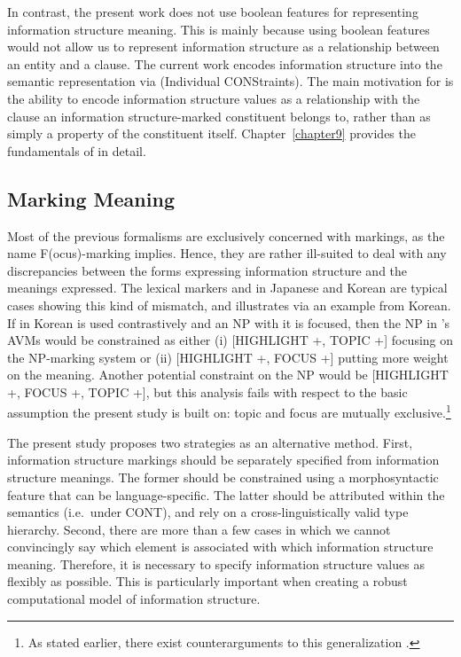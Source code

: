 In contrast, the present work does not use boolean features for
representing information structure meaning. This is mainly because
using boolean features would not allow us to represent information
structure as a relationship between an entity and a clause. The
current work encodes information structure into the semantic
representation via  (Individual CONStraints).
The main motivation for  is the ability to
encode information structure values as a relationship with the clause
an information structure-marked constituent belongs to, rather than as
simply a property of the constituent itself.  Chapter~\ref{chapter9}
provides the fundamentals of  in detail.




\subsection{Marking \vs Meaning}
\label{8:ssec:hpsg:makring-meaning}

Most of the previous formalisms are exclusively concerned with
markings, as the name F(ocus)-marking implies.  Hence, they are rather
ill-suited to deal with any discrepancies between the forms expressing
information structure and the meanings expressed.
The lexical markers \wa and \nun in Japanese and Korean are typical
cases showing this kind of mismatch, and 
illustrates via an example from Korean.  If \nun in Korean is used
contrastively and an NP with it is focused, then the NP in
\citeauthor{kim:07}'s AVMs would be constrained as either (i) [HIGHLIGHT +,
  TOPIC +] focusing on the NP-marking system or (ii) [HIGHLIGHT +,
  FOCUS +] putting more weight on the meaning. Another potential
constraint on the NP would be [HIGHLIGHT +, FOCUS +, TOPIC +], but
this analysis fails with respect to the basic assumption the present
study is built on: topic and focus are mutually exclusive.\footnote{As
  stated earlier, there exist counterarguments to this generalization
  \citep{krifka:08}.}



The present study proposes two strategies as an alternative method.
First, information structure markings should be separately specified
from information structure meanings. The former should be constrained
using a morphosyntactic feature that can be language-specific. The
latter should be attributed within the semantics (i.e.\ under CONT),
and rely on a cross-linguistically valid type hierarchy. Second, there
are more than a few cases in which we cannot convincingly say which
element is associated with which information structure meaning.
Therefore, it is necessary to specify information structure values as
flexibly as possible. This is particularly important when creating a
robust computational model of information structure.





